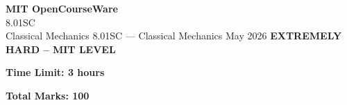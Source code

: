 \documentclass[12pt,a4paper]{exam}
\begin{document}
\begin{center}
{\LARGE \textbf{MIT OpenCourseWare}}\\8.01SC\\Classical Mechanics
\vspace{0.5cm}
{8.01SC} --- {Classical Mechanics}
\vspace{0.3cm}
May 2026
\vspace{0.3cm}
\textbf{EXTREMELY HARD -- MIT LEVEL}
\end{center}

\begin{center}
\textbf{Time Limit: 3 hours}
\end{center}

\begin{center}
\textbf{Total Marks: 100}
\end{center}

\vspace{0.5cm}
\end{document}
